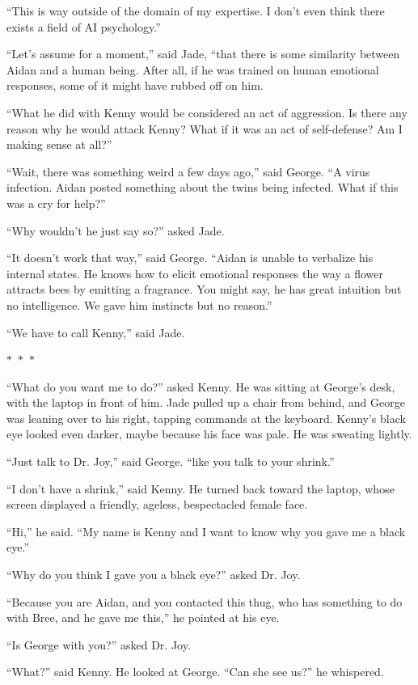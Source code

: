 \documentclass{memoir}
\newcommand{\starbreak}{%
\begin{center}
  $\ast$~$\ast$~$\ast$
\end{center}
}
\begin{document}
``This is way outside of the domain of my expertise. I don't even think there exists a field of AI psychology.''

``Let's assume for a moment,'' said Jade, ``that there is some similarity between Aidan and a human being. After all, if he was trained on human emotional responses, some of it might have rubbed off on him. 

``What he did with Kenny would be considered an act of aggression. Is there any reason why he would attack Kenny? What if it was an act of self-defense? Am I making sense at all?''

``Wait, there was something weird a few days ago,'' said George. ``A virus infection. Aidan posted something about the twins being infected. What if this was a cry for help?''

``Why wouldn't he just say so?'' asked Jade.

``It doesn't work that way,'' said George. ``Aidan is unable to verbalize his internal states. He knows how to elicit emotional responses the way a flower attracts bees by emitting a fragrance. You might say, he has great intuition but no intelligence. We gave him instincts but no reason.''

``We have to call Kenny,'' said Jade.

\starbreak

``What do you want me to do?'' asked Kenny. He was sitting at George's desk, with the laptop in front of him. Jade pulled up a chair from behind, and George was leaning over to his right, tapping commands at the keyboard. Kenny's black eye looked even darker, maybe because his face was pale. He was sweating lightly. 

``Just talk to Dr. Joy,'' said George. ``like you talk to your shrink.''

``I don't have a shrink,'' said Kenny. He turned back toward the laptop, whose screen displayed a friendly, ageless, bespectacled female face.

``Hi,'' he said. ``My name is Kenny and I want to know why you gave me a black eye.''

``Why do you think I gave you a black eye?'' asked Dr. Joy.

``Because you are Aidan, and you contacted this thug, who has something to do with Bree, and he gave me this,'' he pointed at his eye.

``Is George with you?'' asked Dr. Joy.

``What?'' said Kenny. He looked at George. ``Can she see us?'' he whispered.
\end{document}
